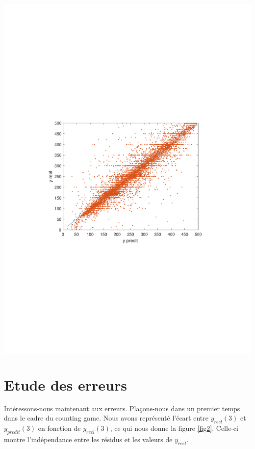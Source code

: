 \documentclass{scrreprt}
\begin{document}
\begin{center}
\includegraphics[trim = 3cm 9cm 3cm 9cm, clip]{yreelypredit.pdf}
\label{fig1}
\end{center}

 

\section{Etude des erreurs}

Intéressons-nous maintenant aux erreurs. Plaçons-nous dans un premier temps dans le cadre du counting game. Nous avons représenté l'écart entre $y_{reel}(3)$ et $y_{predit}(3)$ en fonction de $ y_{reel}(3)$, ce qui nous donne la figure \ref{fig2}. Celle-ci montre l'indépendance entre les résidus et les valeurs de $y_{reel}$.\\
\end{document}
